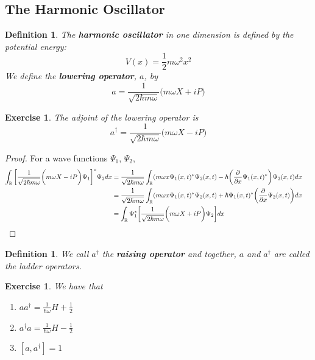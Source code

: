 \documentclass[12pt]{amsart}
\newtheorem{defn}[thm]{Definition}
\newtheorem{ex}[thm]{Exercise}
\newcommand{\om}{\omega}
\newcommand{\R}{\mathbb{R}}
\newcommand{\p}[1]{\frac{\partial}{\partial{#1}}}
\begin{document}
\subsection{The Harmonic Oscillator}

\begin{defn}
The \textbf{harmonic oscillator} in one dimension is defined by the potential energy: $$V(x) = \frac{1}{2}m \om^2 x^2$$ We define the \textbf{lowering operator}, $a$, by $$a = \frac{1}{\sqrt{2 \hbar m \om }}\bigg(m\om X +iP\bigg)$$ 
\end{defn}

\begin{ex}
The adjoint of the lowering operator is $$a^{\dagger} = \frac{1}{\sqrt{2 \hbar m \om }}\bigg(m\om X -iP\bigg)$$
\end{ex}

\begin{proof}
For a wave functions $\Psi_1$, $\Psi_2$,
\begin{align*}
\int_{\R}\bigg[ \frac{1}{\sqrt{2 \hbar m \om }}\bigg(m\om X -iP\bigg)\Psi_1 \bigg]^* \Psi_2 dx
&= \frac{1}{\sqrt{2 \hbar m \om }}\int_{\R}(m\om x \Psi_1(x,t)^* \Psi_2(x,t) -\hbar \bigg(\p{x}\Psi_1(x,t)^*\bigg)\Psi_2(x,t) dx\\
&=\frac{1}{\sqrt{2 \hbar m \om }}\int_{\R}(m\om x \Psi_1(x,t)^* \Psi_2(x,t) +\hbar \Psi_1(x,t)^*\bigg(\p{x}\Psi_2(x,t)\bigg) dx \hspace{.5cm}\\
&=\int_{\R}\Psi_1^*\bigg[ \frac{1}{\sqrt{2 \hbar m \om }}\bigg(m\om X +iP\bigg)\Psi_2 \bigg]  dx
\end{align*}
\end{proof}

\begin{defn}
We call $a^{\dagger}$ the \textbf{raising operator} and together, $a$ and $a^{\dagger}$ are called the ladder operators.
\end{defn}

\begin{ex}
We have that 
\begin{enumerate}
\item $aa^{\dagger} = \frac{1}{\hbar \om}H + \frac{1}{2}$
\item $a^{\dagger}a = \frac{1}{\hbar \om}H - \frac{1}{2}$
\item $[a,a^{\dagger}] = 1$
\end{enumerate}
\end{ex}
\end{document}
